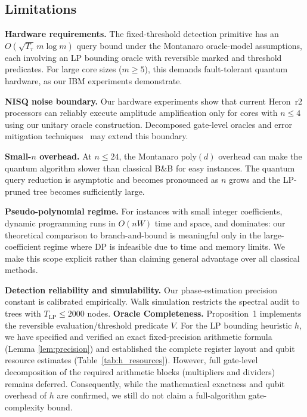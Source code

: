 \documentclass[conference]{IEEEtran} \IEEEoverridecommandlockouts
\begin{document}
\subsection{Limitations}

\textbf{Hardware requirements.} The fixed-threshold detection primitive has an $O(\sqrt{T_{\tau}}\,m\log m)$ query bound under the Montanaro oracle-model assumptions, each involving an LP bounding oracle with reversible marked and threshold predicates. For large core sizes ($m \geq 5$), this demands fault-tolerant quantum hardware, as our IBM experiments demonstrate.

\textbf{NISQ noise boundary.} Our hardware experiments show that current Heron~r2 processors can reliably execute amplitude amplification only for cores with $n \leq 4$ using our unitary oracle construction. Decomposed gate-level oracles and error mitigation techniques~\cite{ref31} may extend this boundary.

\textbf{Small-$n$ overhead.} At $n \leq 24$, the Montanaro $\text{poly}(d)$ overhead can make the quantum algorithm slower than classical B\&B for easy instances. The quantum query reduction is asymptotic and becomes pronounced as $n$ grows and the LP-pruned tree becomes sufficiently large.

\textbf{Pseudo-polynomial regime.} For instances with small integer coefficients, dynamic programming runs in $O(nW)$ time and space, and dominates: our theoretical comparison to branch-and-bound is meaningful only in the large-coefficient regime where DP is infeasible due to time and memory limits. We make this scope explicit rather than claiming general advantage over all classical methods.

\textbf{Detection reliability and simulability.} Our phase-estimation precision constant is calibrated empirically. Walk simulation restricts the spectral audit to trees with $T_{\text{LP}} \le 2000$ nodes. \textbf{Oracle Completeness.} Proposition~1 implements the reversible evaluation/threshold predicate $V$. For the LP bounding heuristic $h$, we have specified and verified an exact fixed-precision arithmetic formula (Lemma \ref{lem:precision}) and established the complete register layout and qubit resource estimates (Table~\ref{tab:h_resources}). However, full gate-level decomposition of the required arithmetic blocks (multipliers and dividers) remains deferred. Consequently, while the mathematical exactness and qubit overhead of $h$ are confirmed, we still do not claim a full-algorithm gate-complexity bound.
\end{document}
